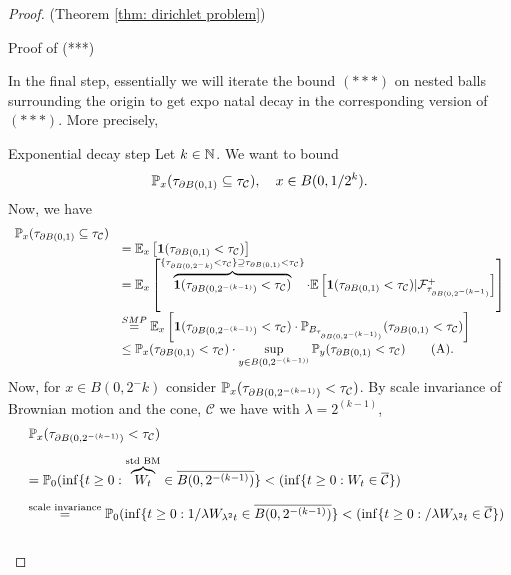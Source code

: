 \documentclass{article}
\begin{document}
\begin{proof}{(Theorem \ref{thm: dirichlet problem})}
\begin{examplesblock}{Proof of (***)}
\end{examplesblock}

In the final step, essentially we will iterate the bound $ (***)$ on nested balls surrounding the origin to get expo natal decay in the corresponding version of $ (***)$. More precisely, 

\begin{examplesblock}{Exponential decay step}\label{aside: poincare cone decay bound}
Let $ k\in \mathbb{N}$. We want to bound 
\[
\mathbb{P}_{x}(\tau_{\partial B(0,1)}\subseteq \tau_{ \mathcal{C}}), \quad x\in B(0, 1/2^k).
\]
Now, we have 
\[
\begin{array}{ll}
	\mathbb{P}_{x}(\tau_{\partial B(0,1)}\subseteq \tau_{ \mathcal{C}})&\\ 
	&= \mathbb{E}_{x}\left[ \mathbf{1}(\tau_{\partial B(0,1)}<\tau_{\mathcal{C}}) \right] \\
								&= \mathbb{E}_{x}\left[ \overbrace{\mathbf{1}(\tau_{\partial B(0,2^{-(k-1)})}<\tau_{\mathcal{C}})}^{\{\tau_{\partial B(0, 2^-k)}<\tau_{ \mathcal{C}}\}\supseteq \tau_{\partial B(0, 1)}<\tau_{ \mathcal{C}}\}}\cdot \mathbb{E}\left[ \mathbf{1}(\tau_{\partial B(0,1)}<\tau_{ \mathcal{C}})|\mathcal{F}^{+}_{\tau_{\partial B(0, 2^{-(k-1})}} \right] \right]\\ 
								&\stackrel{SMP}{=} \mathbb{E}_{x}\left[ \mathbf{1}(\tau_{\partial B(0,2^{-(k-1)})}<\tau_{\mathcal{C}}) \cdot \mathbb{P}_{B_{\tau_{\partial B(0,2^{-(k-1)})}}}(\tau_{\partial B(0,1)}<\tau_{ \mathcal{C}})\right]\\ 
								&\leq \mathbb{P}_{x}(\tau_{\partial B(0,1)}<\tau_{ \mathcal{C}})\cdot \displaystyle\sup_{y\in B(0, 2^{-(k-1))}}\mathbb{P}_{y}(\tau_{\partial B(0,1)}<\tau_{ \mathcal{C}})\tag{A}.
\end{array}
\]
Now, for $ x\in B(0, 2^-k)$ consider $ \mathbb{P}_{x}(\tau_{\partial B(0, 2^{-(k-1)})}<\tau_{ \mathcal{C}})$. By scale invariance of Brownian motion and the cone, $ \mathcal{C}$ we have with $ \lambda = 2^{(k-1)}$, 
\[
\begin{array}{ll}
&\mathbb{P}_{x}(\tau_{\partial B(0, 2^{-(k-1)})}<\tau_{ \mathcal{C}})\\[10pt]
&= \mathbb{P}_{0}(\displaystyle\inf\{t\geq 0: \overbrace{W_{t}}^{\text{std BM}} \in \overline{B(0, 2^{-(k-1)})}\}<(\displaystyle\inf\{t\geq 0: W_{t} \in \overline{ \mathcal{C}}\}) \\[10pt]
&\stackrel{\text{scale invariance}}{=} \mathbb{P}_{0}(\displaystyle\inf\{t\geq 0: 1/\lambda W_{\lambda^{2}t} \in \overline{B(0, 2^{-(k-1)})}\}<(\displaystyle\inf\{t\geq 0: /\lambda W_{\lambda^{2}t} \in \overline{ \mathcal{C}}\}) \\[10pt]

\end{array}\]
\end{examplesblock}
\end{proof}
\end{document}
